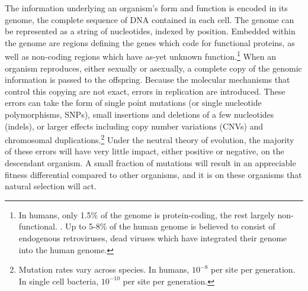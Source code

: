 The information underlying an organism's form and function is encoded in its genome, the complete sequence of DNA contained in each cell.
The genome can be represented as a string of nucleotides, indexed by position.
Embedded within the genome are regions defining the genes which code for functional proteins, as well as non-coding regions which have as-yet unknown function.\footnote{In humans, only 1.5\% of the genome is protein-coding, the rest largely non-functional. \cite{Lander:2001hk}. Up to 5-8\% of the human genome is believed to consist of endogenous retroviruses, dead viruses which have integrated their genome into the human genome.}
When an organism reproduces, either sexually or asexually, a complete copy of the genomic information is passed to the offspring.
Because the molecular mechanisms that control this copying are not exact, errors in replication are introduced.
These errors can take the form of single point mutations (or single nucleotide polymorphisms, SNPs), small insertions and deletions of a few nucleotides (indels), or larger effects including copy number variations (CNVs) and chromosomal duplications.\footnote{Mutation rates vary across species. In humans, $10^{-8}$ per site per generation. In single cell bacteria, $10^{-10}$ per site per generation.}
Under the neutral theory of evolution, the majority of these errors will have very little impact, either positive or negative, on the descendant organism.
A small fraction of mutations will result in an appreciable fitness differential compared to other organisms, and it is on these organisms that natural selection will act.

